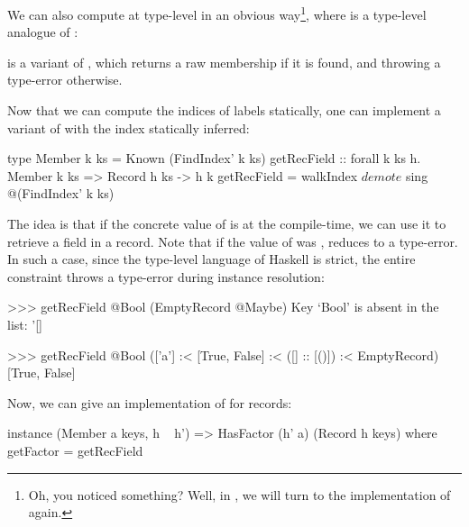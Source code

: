 \documentclass[demotion-paper.tex]{subfiles}
\begin{document}
We can also compute  at type-level in an obvious way\footnote{Oh, you noticed something? Well, in , we will turn to the implementation of  again.}, where \haskinline{(<$>)} is a type-level analogue of :
 is a variant of , which returns a raw membership if it is found, and throwing a type-error otherwise.

Now that we can compute the indices of labels statically, one can implement a variant of  with the index statically inferred:
\begin{code}
type Member k ks = Known (FindIndex' k ks)
getRecField :: forall k ks h.
  Member k ks => Record h ks -> h k
getRecField = walkIndex $ 
  demote $ sing @(FindIndex' k ks)
\end{code}
The idea is that if the concrete value of  is  at the compile-time, we can use it to retrieve a field in a record.
Note that if the value of  was ,  reduces to a type-error.
In such a case, since the type-level language of Haskell is strict, the entire constraint  throws a type-error during instance resolution:
\begin{repl}
>>> getRecField @Bool (EmptyRecord @Maybe)
Key `Bool' is absent in the list: '[]

>>> getRecField @Bool (['a'] :< [True, False]
                :< ([] :: [()]) :< EmptyRecord)
[True, False]
\end{repl}

Now, we can give an implementation of  for records:
\begin{code}
instance (Member a keys, h ~ h')
      => HasFactor (h' a) (Record h keys) where
  getFactor = getRecField
\end{code}
\end{document}
